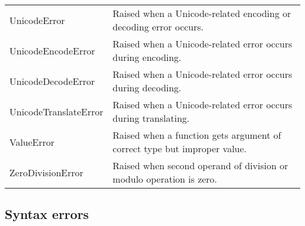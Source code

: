 \documentclass[11pt]{article}
\begin{document}
\begin{longtable}[]{@{}ll@{}}
\begin{minipage}[t]{0.15\columnwidth}
UnicodeError\strut
\end{minipage} & \begin{minipage}[t]{0.79\columnwidth}\raggedright\strut
Raised when a Unicode-related encoding or decoding error occurs.\strut
\end{minipage}\tabularnewline
\begin{minipage}[t]{0.15\columnwidth}\raggedright\strut
UnicodeEncodeError\strut
\end{minipage} & \begin{minipage}[t]{0.79\columnwidth}\raggedright\strut
Raised when a Unicode-related error occurs during encoding.\strut
\end{minipage}\tabularnewline
\begin{minipage}[t]{0.15\columnwidth}\raggedright\strut
UnicodeDecodeError\strut
\end{minipage} & \begin{minipage}[t]{0.79\columnwidth}\raggedright\strut
Raised when a Unicode-related error occurs during decoding.\strut
\end{minipage}\tabularnewline
\begin{minipage}[t]{0.15\columnwidth}\raggedright\strut
UnicodeTranslateError\strut
\end{minipage} & \begin{minipage}[t]{0.79\columnwidth}\raggedright\strut
Raised when a Unicode-related error occurs during translating.\strut
\end{minipage}\tabularnewline
\begin{minipage}[t]{0.15\columnwidth}\raggedright\strut
ValueError\strut
\end{minipage} & \begin{minipage}[t]{0.79\columnwidth}\raggedright\strut
Raised when a function gets argument of correct type but improper
value.\strut
\end{minipage}\tabularnewline
\begin{minipage}[t]{0.15\columnwidth}\raggedright\strut
ZeroDivisionError\strut
\end{minipage} & \begin{minipage}[t]{0.79\columnwidth}\raggedright\strut
Raised when second operand of division or modulo operation is
zero.\strut
\end{minipage}\tabularnewline
\bottomrule
\end{longtable}

    \subsection{Syntax errors}\label{syntax-errors}
\end{document}
